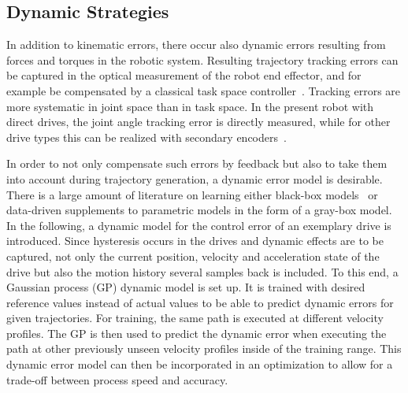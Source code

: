 \documentclass[5p,times,procedia]{elsarticle}
\begin{document}
\subsection{Dynamic Strategies}\label{subsec:dynError}
In addition to kinematic errors, there occur also dynamic errors resulting from forces and torques in the robotic system.
Resulting trajectory tracking errors can be captured in the optical measurement of the robot end effector, and for example be compensated by a classical task space controller~\cite{Siciliano09}.
Tracking errors are more systematic in joint space than in task space.
In the present robot with direct drives, the joint angle tracking error is directly measured, while for other drive types this can be realized with secondary encoders~\cite{Mesmer22}.

In order to not only compensate such errors by feedback but also to take them into account during trajectory generation, a dynamic error model is desirable.
There is a large amount of literature on learning either black-box models~\cite{NguyenTuong08b} or data-driven supplements to parametric models in the form of a gray-box model.
In the following, a dynamic model for the control error of an exemplary drive is introduced.
Since hysteresis occurs in the drives and dynamic effects are to be captured, not only the current position, velocity and acceleration state of the drive but also the motion history several samples back is included. 
To this end, a Gaussian process (GP) dynamic model is set up.
It is trained with desired reference values instead of actual values to be able to predict dynamic errors for given trajectories.
For training, the same path is executed at different velocity profiles. 
The GP is then used to predict the dynamic error when executing the path at other previously unseen velocity profiles inside of the training range.
This dynamic error model can then be incorporated in an optimization to allow for a trade-off between process speed and accuracy.
%
\end{document}
